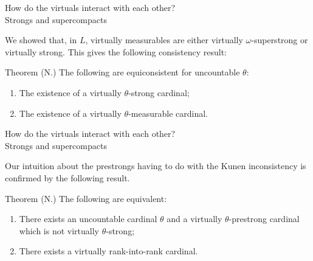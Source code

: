 \documentclass{beamer}
\begin{document}
\begin{frame}{How do the virtuals interact with each other? \\
              {\small Strongs and supercompacts}}

  We showed that, in $L$, virtually measurables are either virtually $\omega$-superstrong or virtually strong. This gives the following consistency result:

  \begin{block}{Theorem (N.)}
    The following are equiconsistent for uncountable $\theta$:
    \begin{enumerate}
      \item The existence of a virtually $\theta$-strong cardinal;
      \item The existence of a virtually $\theta$-measurable cardinal.
    \end{enumerate}
  \end{block}



\end{frame}

\begin{frame}{How do the virtuals interact with each other? \\
              {\small Strongs and supercompacts}}

  Our intuition about the prestrongs having to do with the Kunen inconsistency is confirmed by the following result.

  \begin{block}{Theorem (N.)}
    The following are equivalent:
    \begin{enumerate}
      \item There exists an uncountable cardinal $\theta$ and a virtually $\theta$-prestrong cardinal which is not virtually $\theta$-strong;
      \item There exists a \alert<2>{virtually rank-into-rank cardinal}.
    \end{enumerate}
  \end{block}


\end{frame}
\end{document}
